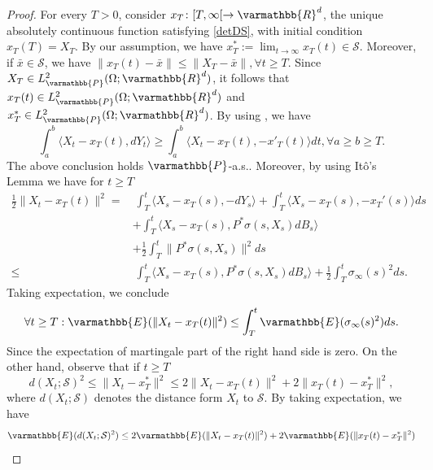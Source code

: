 \documentclass[11pt,reqno]{article}
\let\mathbb=\varmathbb
\newcommand{\R}{\mathbb{R}}
\newcommand{\1}{\mathds{1}}
\numberwithin{equation}{section}  %
\theoremstyle{plain}
\theoremstyle{definition}
\theoremstyle{remark}
\numberwithin{theorem}{section}
\numberwithin{remark}{section}
\numberwithin{example}{section}
\begin{document}
\begin{proof}
For every $T>0$, consider $x_T\colon [T,\infty[\to \R^d$, the unique absolutely continuous function satisfying \eqref{detDS}, with initial condition $x_T(T) = X_T$. By our assumption, we have $\displaystyle x_T^\ast := \lim_{t\to \infty} x_T(t)\in \mathcal{S}$. Moreover, if $\bar x\in \mathcal{S}$, we have $\|x_T(t)-\bar x\|\leq \|X_T-\bar x\|, \forall t\geq T$. Since $X_T\in L^2_{\mathbb{P}}(\Omega;\R^d)$, it follows that $x_T(t)\in L^2_{\mathbb{P}}(\Omega;\R^d)$ and $x_T^\ast\in L^2_{\mathbb{P}}(\Omega;\R^d)$. By using \cite[Proposition 6.17]{MR3308895}, we have
\begin{equation*}
    \int_a^b \langle X_t - x_{T}(t) , dY_t\rangle \geq \int_a^b \langle X_t - x_{T}(t) ,-x'_{T}(t)\rangle dt, \forall a\geq b\geq T.
\end{equation*}
The above conclusion holds $\mathbb{P}$-a.s.. Moreover, by using Itô's Lemma we have for  $t\geq T$
\begin{equation*}
    \begin{aligned}
    \frac{1}{2}\|X_t-x_T(t)\|^2 = & \    \int_T^t\langle X_s-x_T(s), -dY_s\rangle + \int_T^t\langle X_s-x_T(s), -x_T'(s)\rangle ds\\
    & + \int_T^t\langle X_s-x_T(s), P^\ast\sigma(s,X_s)dB_s\rangle\\
    &+ \frac{1}{2}\int_T^t\|P^\ast\sigma(s,X_s)\|^2 ds\\
    \leq & \ \int_T^t\langle X_s-x_T(s), P^\ast\sigma(s,X_s)dB_s\rangle + \frac{1}{2}\int_T^t\sigma_\infty(s)^2 ds.
    \end{aligned}
\end{equation*}
Taking expectation, we conclude 
\begin{equation*}
    \forall t\geq T : \mathbb{E}(\|X_t-x_T(t)\|^2)\leq \int_T^t\mathbb{E}(\sigma_\infty(s)^2)ds.
\end{equation*}
Since the expectation of martingale part of the right hand side is zero. On the other hand, observe that if $t\geq T$
\begin{equation*}
    d(X_t;\mathcal{S})^2\leq \|X_t-x^\ast_T\|^2\leq 2\|X_t-x_T(t)\|^2 + 2\|x_T(t)-x_T^\ast\|^2,
\end{equation*}
where $d(X_t;\mathcal{S})$ denotes the distance form $X_t$ to $\mathcal{S}$. By taking expectation, we have
\begin{equation*}
    \begin{aligned}
        \mathbb{E}(d(X_t;\mathcal{S})^2)&\leq 2\mathbb{E}(\|X_t-x_T(t)\|^2) + 2\mathbb{E}(\|x_T(t)-x_T^\ast\|^2)\\

\end{aligned}
\end{equation*}
\end{proof}
\end{document}
